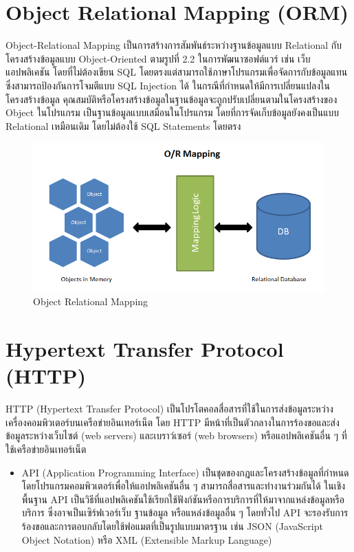 \section{Object Relational Mapping (ORM)}
Object-Relational Mapping \cite{orm} เป็นการสร้างการสัมพันธ์ระหว่างฐานข้อมูลแบบ Relational กับโครงสร้างข้อมูลแบบ Object-Oriented 
ตามรูปที่ 2.2 ในการพัฒนาซอฟต์แวร์ เช่น เว็บแอปพลิเคชัน โดยที่ไม่ต้องเขียน SQL โดยตรงแต่สามารถใช้ภาษาโปรแกรมเพื่อจัดการกับข้อมูลแทน 
ซึ่งสามารถป้องกันการโจมตีแบบ SQL Injection ได้ ในกรณีที่กำหนดให้มีการเปลี่ยนแปลงในโครงสร้างข้อมูล 
คุณสมบัติหรือโครงสร้างข้อมูลในฐานข้อมูลจะถูกปรับเปลี่ยนตามในโครงสร้างของ Object ในโปรแกรม เป็นฐานข้อมูลแบบเสมือนในโปรแกรม 
โดยที่การจัดเก็บข้อมูลยังคงเป็นแบบ Relational เหมือนเดิม โดยไม่ต้องใช้ SQL Statements โดยตรง
\begin{figure}[ht]
  \begin{center}
  \includegraphics[scale=0.3]{resources/ORM.png}
  \end{center}
  \caption[Object Relational Mapping]{Object Relational Mapping}
  \label{fig:orm}
\end{figure}

\section{Hypertext Transfer Protocol (HTTP)}
HTTP (Hypertext Transfer Protocol) เป็นโปรโตคอลสื่อสารที่ใช้ในการส่งข้อมูลระหว่างเครื่องคอมพิวเตอร์บนเครือข่ายอินเทอร์เน็ต โดย HTTP 
มีหน้าที่เป็นตัวกลางในการร้องขอและส่งข้อมูลระหว่างเว็บไซต์ (web servers) และเบราว์เซอร์ (web browsers) หรือแอปพลิเคชันอื่น ๆ 
ที่ใช้เครือข่ายอินเทอร์เน็ต 
\begin{itemize}
  \item API (Application Programming Interface) เป็นชุดของกฎและโครงสร้างข้อมูลที่กำหนดโดยโปรแกรมคอมพิวเตอร์เพื่อให้แอปพลิเคชันอื่น ๆ 
  สามารถสื่อสารและทำงานร่วมกันได้ ในเชิงพื้นฐาน API เป็นวิธีที่แอปพลิเคชันใช้เรียกใช้ฟังก์ชันหรือการบริการที่ให้มาจากแหล่งข้อมูลหรือบริการ
  ซึ่งอาจเป็นเซิร์ฟเวอร์เว็บ ฐานข้อมูล หรือแหล่งข้อมูลอื่น ๆ โดยทั่วไป API จะรองรับการร้องขอและการตอบกลับโดยใช้ฟอแมตที่เป็นรูปแบบมาตรฐาน เช่น 
  JSON (JavaScript Object Notation) หรือ XML (Extensible Markup Language) 
\end{itemize}

